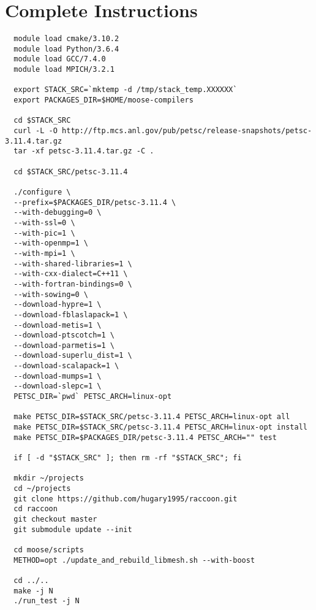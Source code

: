\documentclass[class=Report, crop=false]{standalone}
\begin{document}
\section{Complete Instructions}
\label{sec:complinstr}

\begin{verbatim}
  module load cmake/3.10.2
  module load Python/3.6.4
  module load GCC/7.4.0
  module load MPICH/3.2.1

  export STACK_SRC=`mktemp -d /tmp/stack_temp.XXXXXX`
  export PACKAGES_DIR=$HOME/moose-compilers

  cd $STACK_SRC
  curl -L -O http://ftp.mcs.anl.gov/pub/petsc/release-snapshots/petsc-3.11.4.tar.gz
  tar -xf petsc-3.11.4.tar.gz -C .

  cd $STACK_SRC/petsc-3.11.4

  ./configure \
  --prefix=$PACKAGES_DIR/petsc-3.11.4 \
  --with-debugging=0 \
  --with-ssl=0 \
  --with-pic=1 \
  --with-openmp=1 \
  --with-mpi=1 \
  --with-shared-libraries=1 \
  --with-cxx-dialect=C++11 \
  --with-fortran-bindings=0 \
  --with-sowing=0 \
  --download-hypre=1 \
  --download-fblaslapack=1 \
  --download-metis=1 \
  --download-ptscotch=1 \
  --download-parmetis=1 \
  --download-superlu_dist=1 \
  --download-scalapack=1 \
  --download-mumps=1 \
  --download-slepc=1 \
  PETSC_DIR=`pwd` PETSC_ARCH=linux-opt

  make PETSC_DIR=$STACK_SRC/petsc-3.11.4 PETSC_ARCH=linux-opt all
  make PETSC_DIR=$STACK_SRC/petsc-3.11.4 PETSC_ARCH=linux-opt install
  make PETSC_DIR=$PACKAGES_DIR/petsc-3.11.4 PETSC_ARCH="" test

  if [ -d "$STACK_SRC" ]; then rm -rf "$STACK_SRC"; fi

  mkdir ~/projects
  cd ~/projects
  git clone https://github.com/hugary1995/raccoon.git
  cd raccoon
  git checkout master
  git submodule update --init

  cd moose/scripts
  METHOD=opt ./update_and_rebuild_libmesh.sh --with-boost

  cd ../..
  make -j N
  ./run_test -j N
\end{verbatim}
\end{document}
